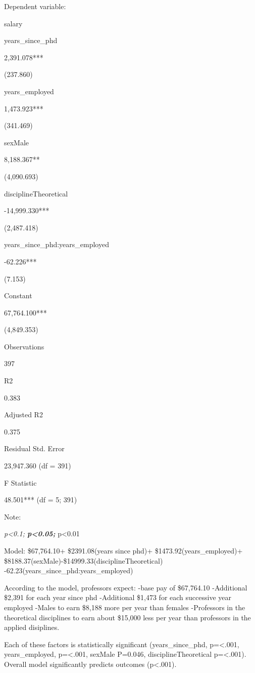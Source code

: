 \documentclass[]{article}
\begin{document}
Dependent variable:

salary

years\_since\_phd

2,391.078***

(237.860)

years\_employed

1,473.923***

(341.469)

sexMale

8,188.367**

(4,090.693)

disciplineTheoretical

-14,999.330***

(2,487.418)

years\_since\_phd:years\_employed

-62.226***

(7.153)

Constant

67,764.100***

(4,849.353)

Observations

397

R2

0.383

Adjusted R2

0.375

Residual Std. Error

23,947.360 (df = 391)

F Statistic

48.501*** (df = 5; 391)

Note:

\emph{p\textless{}0.1; \textbf{p\textless{}0.05; }}p\textless{}0.01

Model: \$67,764.10+ \$2391.08(years since phd)+
\$1473.92(years\_employed)+
\$8188.37(sexMale)-\$14999.33(disciplineTheoretical)
-62.23(years\_since\_phd:years\_employed)

According to the model, professors expect: -base pay of \$67,764.10
-Additional \$2,391 for each year since phd -Additional \$1,473 for each
successive year employed -Males to earn \$8,188 more per year than
females -Professors in the theoretical disciplines to earn about
\$15,000 less per year than professors in the applied disiplines.

Each of these factors is statistically significant (years\_since\_phd,
p=\textless{}.001, years\_employed, p=\textless{}.001, sexMale P=0.046,
disciplineTheoretical p=\textless{}.001). Overall model significantly
predicts outcomes (p\textless{}.001).
\end{document}
